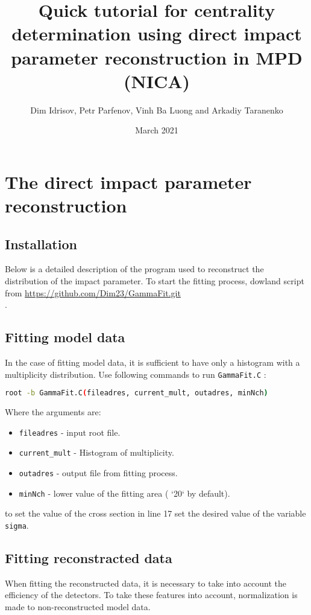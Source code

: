 \documentclass[11pt]{article}
\title{Quick tutorial for centrality determination using direct impact parameter reconstruction in MPD (NICA)}
\author{Dim Idrisov, Petr Parfenov, Vinh Ba Luong and Arkadiy Taranenko}
\date{March 2021}
\begin{document}
\maketitle

\section{The direct impact parameter reconstruction}

\subsection{Installation}
Below is a detailed description of the program used to reconstruct the distribution of the impact parameter.
To start the fitting process, dowland script from \url{https://github.com/Dim23/GammaFit.git}\\.

\subsection{Fitting model data}
In the case of fitting model data, it is sufficient to have only a histogram with a multiplicity distribution. Use following commands to run \texttt{GammaFit.C} :

\begin{lstlisting}[language=bash,caption={}]
 root -b GammaFit.C(fileadres, current_mult, outadres, minNch)
\end{lstlisting}
Where the arguments are:
\begin{itemize}
\item \texttt{fileadres} - input root file.
\item \texttt{current\_mult} - Histogram of multiplicity.
\item \texttt{outadres} - output file from fitting process.
\item \texttt{minNch} - lower value of the fitting area ( `20` by default).
\end{itemize}

to set the value of the cross section in line 17 set the desired value of the variable \texttt{sigma}.

\subsection{Fitting reconstracted data}
When fitting the reconstructed data, it is necessary to take into account the efficiency of the detectors. To take these features into account, normalization is made to non-reconstructed model data.
\end{document}
